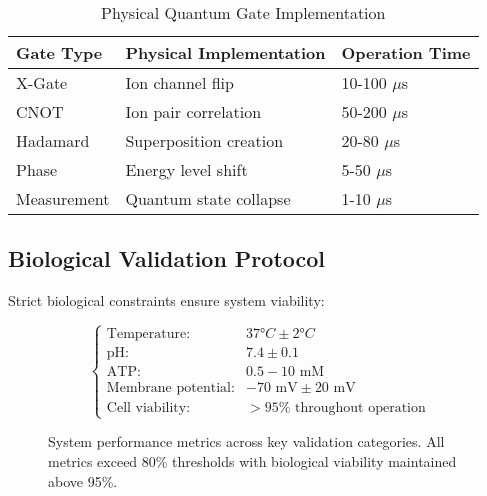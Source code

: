 \documentclass[12pt,a4paper]{article}
\begin{document}
\begin{table}[H]
\centering
\caption{Physical Quantum Gate Implementation}
\label{tab:quantum_gates}
\begin{tabular}{lll}
\toprule
\textbf{Gate Type} & \textbf{Physical Implementation} & \textbf{Operation Time} \\
\midrule
X-Gate & Ion channel flip & 10-100 $\mu$s \\
CNOT & Ion pair correlation & 50-200 $\mu$s \\
Hadamard & Superposition creation & 20-80 $\mu$s \\
Phase & Energy level shift & 5-50 $\mu$s \\
Measurement & Quantum state collapse & 1-10 $\mu$s \\
\bottomrule
\end{tabular}
\end{table}

\subsection{Biological Validation Protocol}

Strict biological constraints ensure system viability:

\begin{equation}
\begin{cases}
\text{Temperature:} & 37°C \pm 2°C \\
\text{pH:} & 7.4 \pm 0.1 \\
\text{ATP:} & 0.5-10 \text{ mM} \\
\text{Membrane potential:} & -70 \text{ mV} \pm 20 \text{ mV} \\
\text{Cell viability:} & >95\% \text{ throughout operation}
\end{cases}
\label{eq:bio_constraints}
\end{equation}

\begin{figure}[H]
\centering
{}
\caption{System performance metrics across key validation categories. All metrics exceed 80\% thresholds with biological viability maintained above 95\%.}
\label{fig:performance_metrics}
\end{figure}
\end{document}
